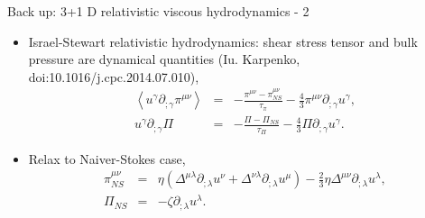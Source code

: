 \documentclass[11pt]{beamer}
\begin{document}
\begin{frame}[noframenumbering]{Back up: 3+1 D relativistic viscous hydrodynamics - 2}
\begin{itemize}
\item Israel-Stewart relativistic hydrodynamics: shear stress tensor and bulk pressure are dynamical quantities (Iu. Karpenko, doi:10.1016/j.cpc.2014.07.010),
\begin{eqnarray}
\nonumber
\left\langle u^\gamma \partial_{;\gamma} \pi^{\mu\nu} \right\rangle
 &=& 
 -\frac{\pi^{\mu\nu} - \pi^{\mu\nu}_{NS}}{\tau_\pi} - \frac{4}{3}\pi^{\mu\nu}\partial_{;\gamma}u^\gamma, \\
 \nonumber
  u^\gamma \partial_{;\gamma} \Pi
 &=& 
 -\frac{\Pi - \Pi_{NS}}{\tau_\Pi} - \frac{4}{3}\Pi\partial_{;\gamma}u^\gamma.
\end{eqnarray}
\item Relax to Naiver-Stokes case,
\begin{eqnarray}
\nonumber
\pi^{\mu\nu}_{NS} &=& \eta(\Delta^{\mu\lambda}\partial_{;\lambda}u^\nu + \Delta^{\nu\lambda}\partial_{;\lambda}u^\mu ) - \frac{2}{3}\eta\Delta^{\mu\nu}\partial_{;\lambda}u^\lambda, \\
\nonumber
\Pi_{NS} &=& -\zeta\partial_{;\lambda}u^\lambda.
\end{eqnarray}
\end{itemize}
\end{frame}
\end{document}
